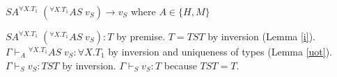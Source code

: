 \begin{case}
$SA^{\forall X.T_{1}}\;(^{\forall X.T_{1}}AS\;v_{S})\rightarrow v_{S}$ where $A\in\lbrace H,M\rbrace$

$SA^{\forall X.T_{1}}\;(^{\forall X.T_{1}}AS\;v_{S}):T$ by premise.  $T=TST$ by inversion (Lemma \ref{i}).  $\Gamma\vdash_{A}{^{\forall X.T_{1}}A}S\;v_{S}:\forall X.T_{1}$ by inversion and uniqueness of types (Lemma \ref{uot}).  $\Gamma\vdash_{S}v_{S}:TST$ by inversion.  $\Gamma\vdash_{S}v_{S}:T$ because $TST=T$.
\end{case}